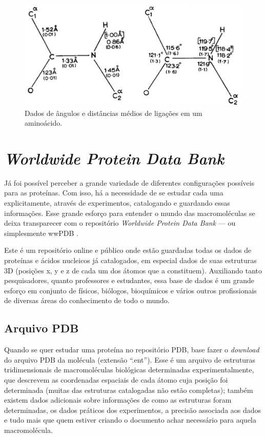 \begin{figure}[H]
	\begin{center}
		\includegraphics[width=0.8\linewidth]{secProteins/figures/rama.png}
	\end{center}
	\caption{Dados de ângulos e distâncias médios de ligações em um aminoácido.}
	\label{fig:rama}
\end{figure}


\section*{\textit{Worldwide Protein Data Bank}}
Já foi possível perceber a grande variedade de diferentes configurações possíveis para as proteínas. Com isso, há a necessidade de se estudar cada uma explicitamente, através de experimentos, catalogando e guardando essas informações. Esse grande esforço para entender o mundo das macromoléculas se deixa transparecer com o repositório \textit{Worldwide Protein Data Bank} --- ou simplesmente wwPDB \cite{wwPDB}.

Este é um repositório online e público onde estão guardadas todas os dados de proteínas e ácidos nucleicos já catalogados, em especial dados de suas estruturas 3D (posições x, y e z de cada um dos átomos que a constituem). Auxiliando tanto pesquisadores, quanto professores e estudantes, essa base de dados é um grande esforço em conjunto de físicos, biólogos, bioquímicos e vários outros profissionais de diversas áreas do conhecimento de todo o mundo.

\subsection*{Arquivo PDB}
Quando se quer estudar uma proteína no repositório PDB, base fazer o \textit{download} do arquivo PDB da molécula (extensão ``.ent''). Esse é um arquivo de estruturas tridimensionais de macromoléculas biológicas determinadas experimentalmente, que descrevem as coordenadas espaciais de cada átomo cuja posição foi determinada (muitas das estruturas catalogadas não estão completas); também existem dados adicionais sobre informações de como as estruturas foram determinadas, os dados práticos dos experimentos, a precisão associada aos dados e tudo mais que quem estiver criando o documento achar necessário para aquela macromolécula.

